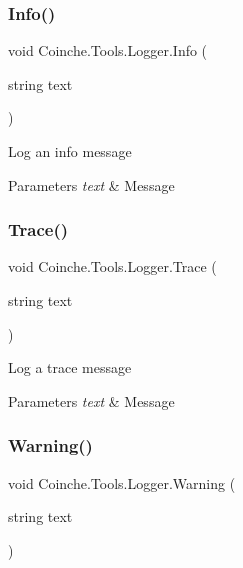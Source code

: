 \subsubsection{\texorpdfstring{Info()}{Info()}}
{\footnotesize\ttfamily void Coinche.\+Tools.\+Logger.\+Info (\begin{DoxyParamCaption}\item[{string}]{text }\end{DoxyParamCaption})\hspace{0.3cm}{\ttfamily [inline]}}



Log an info message 


\begin{DoxyParams}{Parameters}
{\em text} & Message\\
\hline
\end{DoxyParams}
\mbox{\label{class_coinche_1_1_tools_1_1_logger_a8526ceb1f73b054f8bfd867bfe29f7c4}} 
\subsubsection{\texorpdfstring{Trace()}{Trace()}}
{\footnotesize\ttfamily void Coinche.\+Tools.\+Logger.\+Trace (\begin{DoxyParamCaption}\item[{string}]{text }\end{DoxyParamCaption})\hspace{0.3cm}{\ttfamily [inline]}}



Log a trace message 


\begin{DoxyParams}{Parameters}
{\em text} & Message\\
\hline
\end{DoxyParams}
\mbox{\label{class_coinche_1_1_tools_1_1_logger_aa2fb274fdb25913f1f43f16f36d9873c}} 
\subsubsection{\texorpdfstring{Warning()}{Warning()}}
{\footnotesize\ttfamily void Coinche.\+Tools.\+Logger.\+Warning (\begin{DoxyParamCaption}\item[{string}]{text }\end{DoxyParamCaption})\hspace{0.3cm}{\ttfamily [inline]}}



